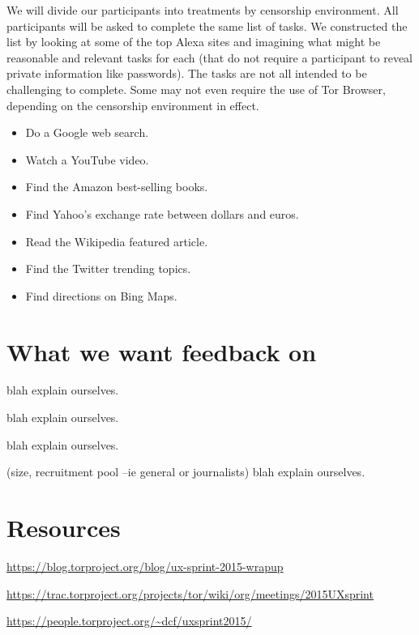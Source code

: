 \documentclass{sig-alternate-hotpets15}
\begin{document}
We will divide our participants into treatments
by censorship environment.
All participants will be asked to complete the same
list of tasks.
We constructed the list by looking at some of the top
Alexa sites and imagining what might be reasonable
and relevant tasks for each
(that do not require a participant to reveal private information
like passwords).
The tasks are not all intended to be challenging to complete.
Some may not even require the use of Tor Browser,
depending on the censorship environment in effect.

\begin{itemize}
\item Do a Google web search.
\item Watch a YouTube video.
\item Find the Amazon best-selling books.
\item Find Yahoo's exchange rate between dollars and euros.
\item Read the Wikipedia featured article.
\item Find the Twitter trending topics.
\item Find directions on Bing Maps.
\end{itemize}

\section{What we want feedback on}

 blah explain ourselves. 

 blah explain ourselves. 

 blah explain ourselves. 

 (size, recruitment pool --ie general or journalists) blah explain ourselves. 

\section{Resources}

\url{https://blog.torproject.org/blog/ux-sprint-2015-wrapup}

\url{https://trac.torproject.org/projects/tor/wiki/org/meetings/2015UXsprint}

\url{https://people.torproject.org/~dcf/uxsprint2015/}


 
\end{document}
